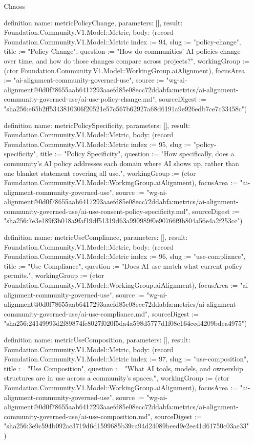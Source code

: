 \begin{lexlean}{Chaoss}
\begin{semanticmodule}
definition{
  name: metricPolicyChange,
  parameters: [],
  result: Foundation.Community.V1.Model::Metric,
  body: (record Foundation.Community.V1.Model::Metric {index := 94, slug := "policy-change", title := "Policy Change", question := "How do communities' AI policies change over time, and how do those changes compare across projects?", workingGroup := (ctor Foundation.Community.V1.Model::WorkingGroup.aiAlignment), focusArea := "ai-alignment-community-governed-use", source := "wg-ai-alignment@0d0f78655aab6417293aaefd85e08ecc72ddabfa:metrics/ai-alignment-community-governed-use/ai-use-policy-change.md", sourceDigest := "sha256:e65b2ff5343810306f20521e57c567b62927a68d6191a9e926edb7ce7c33458c"})
}

definition{
  name: metricPolicySpecificity,
  parameters: [],
  result: Foundation.Community.V1.Model::Metric,
  body: (record Foundation.Community.V1.Model::Metric {index := 95, slug := "policy-specificity", title := "Policy Specificity", question := "How specifically, does a community's AI policy addresses each domain where AI shows up, rather than one blanket statement covering all use.", workingGroup := (ctor Foundation.Community.V1.Model::WorkingGroup.aiAlignment), focusArea := "ai-alignment-community-governed-use", source := "wg-ai-alignment@0d0f78655aab6417293aaefd85e08ecc72ddabfa:metrics/ai-alignment-community-governed-use/ai-use-consent-policy-specificity.md", sourceDigest := "sha256:7e3e189f3b018a9faf19df51319d63a990989f0e90766f9b804a56e4a2f253cc"})
}

definition{
  name: metricUseCompliance,
  parameters: [],
  result: Foundation.Community.V1.Model::Metric,
  body: (record Foundation.Community.V1.Model::Metric {index := 96, slug := "use-compliance", title := "Use Compliance", question := "Does AI use match what current policy permits.", workingGroup := (ctor Foundation.Community.V1.Model::WorkingGroup.aiAlignment), focusArea := "ai-alignment-community-governed-use", source := "wg-ai-alignment@0d0f78655aab6417293aaefd85e08ecc72ddabfa:metrics/ai-alignment-community-governed-use/ai-use-compliance.md", sourceDigest := "sha256:24149993d2f89874fe8027f020f5da4a598d5777d1f08c164ced4209bdea4975"})
}

definition{
  name: metricUseComposition,
  parameters: [],
  result: Foundation.Community.V1.Model::Metric,
  body: (record Foundation.Community.V1.Model::Metric {index := 97, slug := "use-composition", title := "Use Composition", question := "What AI tools, models, and ownership structures are in use across a community's spaces.", workingGroup := (ctor Foundation.Community.V1.Model::WorkingGroup.aiAlignment), focusArea := "ai-alignment-community-governed-use", source := "wg-ai-alignment@0d0f78655aab6417293aaefd85e08ecc72ddabfa:metrics/ai-alignment-community-governed-use/ai-use-composition.md", sourceDigest := "sha256:3e9c594b092ac3719d6d1599685b39ca94d24089beed9e2ee41d61750c03ae33"})
}


\end{semanticmodule}
\end{lexlean}
